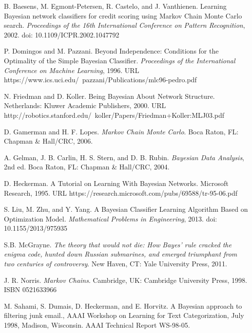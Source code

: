 \documentclass[12pt,twoside]{reedthesis}
\begin{document}

  \backmatter %

\newpage
\begin{thebibliography}{1}

 B. Baesens, M. Egmont-Petersen, R. Castelo, and J. Vanthienen. Learning Bayesian network classifiers for credit scoring using Markov Chain Monte Carlo search. {\em Proceedings of the 16th International Conference on Pattern Recognition}, 2002. doi: 10.1109/ICPR.2002.1047792

 P. Domingos and M. Pazzani. Beyond Independence: Conditions for the Optimality of the Simple Bayesian Classifier. {\em Proceedings of the International Conference on Machine Learning}, 1996. URL https://www.ics.uci.edu/~pazzani/Publications/mlc96-pedro.pdf

 N. Friedman and D. Koller. Being Bayesian About Network Structure. Netherlands: Kluwer Academic Publishers, 2000. URL http://robotics.stanford.edu/~koller/Papers/Friedman+Koller:MLJ03.pdf

 D. Gamerman and H. F. Lopes. {\em Markov Chain Monte Carlo}. Boca Raton, FL: Chapman \& Hall/CRC, 2006.

 A. Gelman, J. B. Carlin, H. S. Stern, and D. B. Rubin. {\em Bayesian Data Analysis}, 2nd ed. Boca Raton, FL: Chapman \& Hall/CRC, 2004.

 D. Heckerman. A Tutorial on Learning With Bayesian Networks. Microsoft Research, 1995. URL https://research.microsoft.com/pubs/69588/tr-95-06.pdf

 S. Liu, M. Zhu, and Y. Yang. A Bayesian Classifier Learning Algorithm Based on Optimization Model. {\em Mathematical Problems in Engineering}, 2013. doi: 10.1155/2013/975935 %

 S.B. McGrayne. {\em The theory that would not die: How Bayes' rule cracked the enigma code, hunted down Russian submarines, and emerged triumphant from two centuries of controversy}. New Haven, CT: Yale University Press, 2011.

 J. R. Norris. {\em Markov Chains}. Cambridge, UK: Cambridge University Press, 1998. ISBN 0521633966

 M. Sahami, S. Dumais, D. Heckerman, and E. Horvitz. A Bayesian approach to filtering junk email., AAAI Workshop on Learning for Text Categorization, July 1998, Madison, Wisconsin. AAAI Technical Report WS-98-05.

\end{thebibliography}
\end{document}

